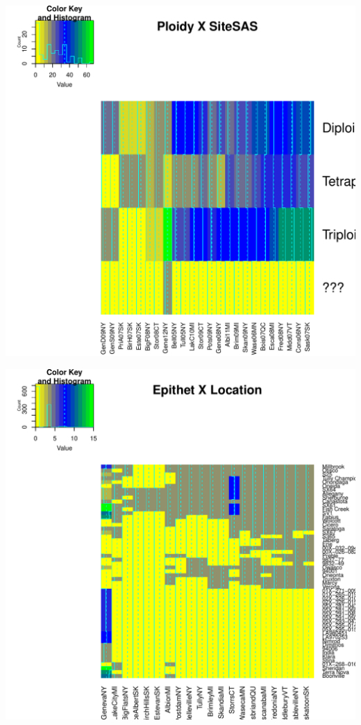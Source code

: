 \documentclass{article}\usepackage[]{graphicx}\usepackage[]{color}
\makeatletter
\def\maxwidth{ %
  \ifdim\Gin@nat@width>\linewidth
    \linewidth
  \else
    \Gin@nat@width
  \fi
}
\newenvironment{knitrout}{}{} %
\makeatother
\begin{document}
\begin{knitrout}
{\centering \includegraphics[width=\maxwidth]{figure/HeatmapCloneSASLocation-2} 

}




{\centering \includegraphics[width=\maxwidth]{figure/HeatmapCloneSASLocation-3} 

}
\end{knitrout}
\end{document}
